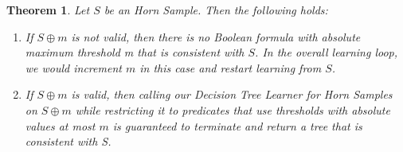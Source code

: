 \documentclass[10pt,a4paper]{article}
\newtheorem{thm}{Theorem}[section]
\theoremstyle{plain}
\theoremstyle{definition}
\begin{document}
\begin{thm} \label{Horn Theorem}
Let $S$ be an Horn Sample. Then the following holds:
\begin{enumerate}
\item If $S \oplus m$ is not valid, then there is \emph{no Boolean formula with absolute maximum threshold m} that is consistent with $S$. In the overall learning loop, we would increment $m$ in this case and restart learning from $S$.

\item If $S \oplus m$ is valid, then calling our Decision Tree Learner for Horn Samples on $S \oplus m$ while restricting it to predicates that use thresholds with absolute values at most $m$ is \emph{guaranteed to terminate and return a tree that is consistent with S}. 
\end{enumerate}
\end{thm}
\end{document}
